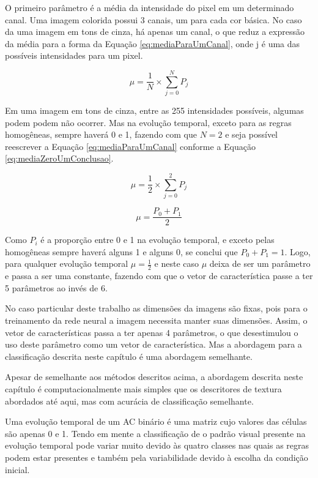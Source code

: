 \documentclass[12pt,a4paper]{report}
\begin{document}
	O primeiro parâmetro é a média da intensidade do pixel em um determinado canal. Uma imagem colorida possui 3 canais, um para cada cor básica. No caso da uma imagem em tons de cinza, há apenas um canal, o que reduz a expressão da média para a forma da Equação \ref{eq:mediaParaUmCanal}, onde j é uma das possíveis intensidades para um pixel.
	
	\begin{equation}
	\mu = \frac{1}{N}\times \sum_{j=0}^{N}P_{j}
	\label{eq:mediaParaUmCanal}
	\end{equation}
	
	Em uma imagem em tons de cinza, entre as 255 intensidades possíveis, algumas podem podem não ocorrer. Mas na evolução temporal, exceto para as regras homogêneas, sempre haverá 0 e 1, fazendo com que $N = 2$ e seja possível reescrever a Equação \ref{eq:mediaParaUmCanal} conforme a Equação \ref{eq:mediaZeroUmConclusao}.
	
	\begin{equation}
	\mu = \frac{1}{2}\times \sum_{j=0}^{2}P_{j}
	\label{eq:mediaZeroUm}
	\end{equation}
	
	\begin{equation}
	\mu = \frac{P_{0}+P_{1}}{2}
	\label{eq:mediaZeroUmConclusao}
	\end{equation}
	
	Como $P_i$ é a proporção entre 0 e 1 na evolução temporal, e exceto pelas homogêneas sempre haverá alguns 1 e alguns 0, se conclui que $P_0 + P_1 = 1$. Logo, para qualquer evolução temporal $\mu = \frac{1}{2}$ e neste caso $\mu$ deixa de ser um parâmetro e passa a ser uma constante, fazendo com que o vetor de característica passe a ter 5 parâmetros ao invés de 6. 
	
	No caso particular deste trabalho as dimensões da imagens são fixas, pois para o treinamento da rede neural a imagem necessita manter suas dimensões. Assim, o vetor de características passa a ter apenas 4 parâmetros, o que desestimulou o uso deste parâmetro como um vetor de característica. Mas a abordagem para a classificação descrita neste capítulo é uma abordagem semelhante.
	
	Apesar de semelhante aos métodos descritos acima, a abordagem descrita neste capítulo é computacionalmente mais simples que os descritores de textura abordados até aqui, mas com acurácia de classificação semelhante.
	
	Uma evolução temporal de um AC binário é uma matriz cujo valores das células são apenas 0 e 1. Tendo em mente a classificação de  o padrão visual presente na evolução temporal pode variar muito devido às quatro classes nas quais as regras podem estar presentes e também pela variabilidade devido à escolha da condição inicial. 
	
\end{document}
